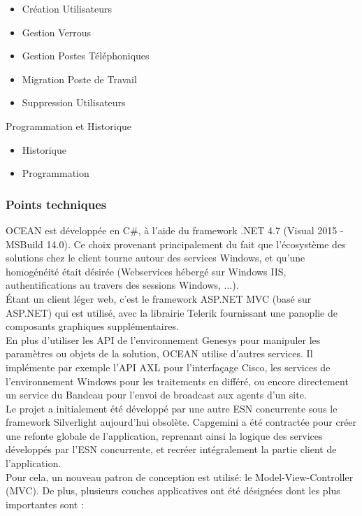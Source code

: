 \documentclass{rapport}
\begin{document}
\begin{itemize}
\begin{minipage}{0.5\textwidth}
        \begin{itemize}
        \item Création Utilisateurs
        \item Gestion Verrous
        \item Gestion Postes Téléphoniques
        \item Migration Poste de Travail
        \item Suppression Utilisateurs
        \end{itemize}
    \vspace{5mm} %
    \item Programmation et Historique
        \begin{itemize}
        \item Historique
        \item Programmation
        \end{itemize}
\end{minipage}
\end{itemize}


\subsubsection{Points techniques}

OCEAN est développée en C\#, à l'aide du framework .NET 4.7 (Visual 2015 - MSBuild 14.0). Ce choix provenant principalement du fait que l'écosystème des solutions chez le client tourne autour des services Windows, et qu'une homogénéité était désirée (Webservices hébergé sur Windows IIS, authentifications au travers des sessions Windows, ...).\\
Étant un client léger web, c'est le framework ASP.NET MVC (basé sur ASP.NET) qui est utilisé, avec la librairie Telerik fournissant une panoplie de composants graphiques supplémentaires.\\

En plus d'utiliser les API de l'environnement Genesys pour manipuler les paramètres ou objets de la solution, OCEAN utilise d'autres services. Il implémente par exemple l'API AXL pour l'interfaçage Cisco, les services de l'environnement Windows pour les traitements en différé, ou encore directement un service du Bandeau pour l'envoi de broadcast aux agents d'un site.\\

Le projet a initialement été développé par une autre ESN concurrente sous le framework Silverlight aujourd'hui obsolète. Capgemini a été contractée pour créer une refonte globale de l'application, reprenant ainsi la logique des services développés par l'ESN concurrente, et recréer intégralement la partie client de l'application.\\
Pour cela, un nouveau patron de conception est utilisé: le Model-View-Controller (MVC). De plus, plusieurs couches applicatives ont été désignées dont les plus importantes sont :\\
\end{document}
